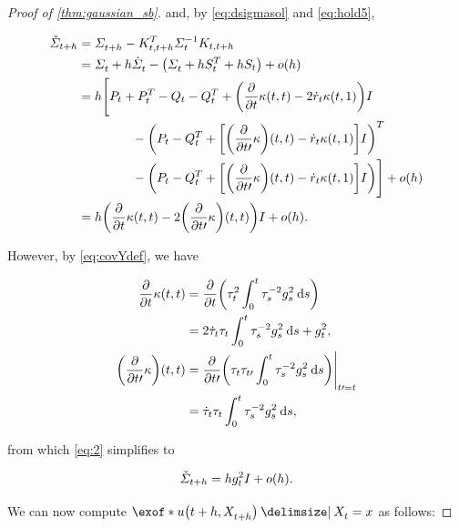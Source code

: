 \begin{proof}[Proof of \cref{thm:gaussian_sb}]
and, by \eqref{eq:dsigmasol} and \eqref{eq:hold5},

\begin{align}
\nn
\Sigmac &= \Sigmasol[\ctime+h] - \Kth^T  \Sigmasolinv \Kth \\
\nn
&= \Sigmasol + h\dSigmasol - \parens*{   \Sigmasol + h \St^T  + h\St } + o(h) \\
\nn
&= h \Bigg[  \Pt + \Pt^T  - \Qt - \Qt^T  +  \parens*{  \frac{\del}{\del \ctime} \kernel[\ctime][\ctime] -2 \dratio \kernel[\ctime][\horizon]  }\eye  \\
\nn
&\hspace{15mm}- \parens*{ \Pt - \Qt^T  + \bracks*{\parens*{ \frac{\del}{\del \ctime\prime}\kernelbase }(\ctime, \ctime) - \dratio \kernel[\ctime][\horizon] } \eye  }^T  \\
&\hspace{15mm}- \parens*{ \Pt - \Qt^T  + \bracks*{\parens*{\frac{\del}{\del \ctime\prime}\kernelbase }(\ctime, \ctime) - \dratio \kernel[\ctime][\horizon] } \eye  }  \Bigg] + o(h) \\
\label{eq:2}
&=  h\parens*{\frac{\del}{\del \ctime} \kernel[\ctime][\ctime]- 2 \parens*{\frac{\del}{\del \ctime\prime}\kernelbase }(\ctime, \ctime)}\eye + o(h).
\end{align}

However, by \eqref{eq:covYdef}, we have

\begin{align}
\nn
\frac{\del}{\del \ctime} \kernel[\ctime][\ctime] &= \frac{\del}{\del \ctime} \parens*{  \aggtimesq[\ctime] \intdasq } \\
\nn
&= 2 \daggtime\aggtime\intdasq + \volatsq[\ctime], \\
\parens*{\frac{\del}{\del \ctime\prime}\kernelbase }(\ctime, \ctime) &= \frac{\del}{\del \ctime\prime} \parens*{  \aggtime[\ctime]\aggtime[\ctime\prime] \intdasq }\Bigg\vert_{\ctime\prime = \ctime} \\
&= \daggtime\aggtime\intdasq, 
\end{align} 

from which \eqref{eq:2} simplifies to

\begin{equation}
\label{eq:sigmacapprox}
\Sigmac = h \volatsq[\ctime] \eye + o(h).
\end{equation}

We can now compute $\exof*{ \testf[\ctime+h][\Xsol[\ctime+h]] \given \Xsol = \point  }$ as follows:


\end{proof}
